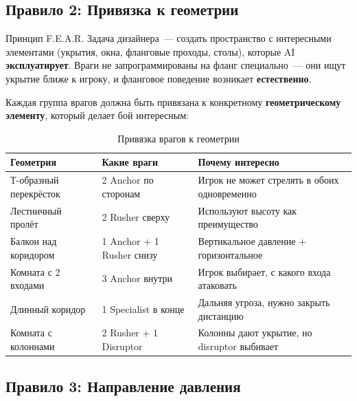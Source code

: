 \documentclass[a4paper,11pt]{report}
\begin{document}
\subsection{Правило 2: Привязка к геометрии}

\begin{principle}{Принцип F.E.A.R.}
Задача дизайнера~--- создать пространство с интересными элементами
(укрытия, окна, фланговые проходы, столы), которые AI \textbf{эксплуатирует}.
Враги не запрограммированы на фланг специально~--- они ищут укрытие
ближе к игроку, и фланговое поведение возникает \textbf{естественно}.
\end{principle}

Каждая группа врагов должна быть привязана к конкретному
\textbf{геометрическому элементу}, который делает бой интересным:

\begin{table}[H]
\centering
\caption{Привязка врагов к геометрии}
\begin{tabularx}{\textwidth}{@{}lXX@{}}
\toprule
\textbf{Геометрия} & \textbf{Какие враги} & \textbf{Почему интересно} \\
\midrule
Т-образный перекрёсток & 2 Anchor по сторонам & Игрок не может стрелять в обоих одновременно \\
Лестничный пролёт & 2 Rusher сверху & Используют высоту как преимущество \\
Балкон над коридором & 1 Anchor + 1 Rusher снизу & Вертикальное давление + горизонтальное \\
Комната с 2 входами & 3 Anchor внутри & Игрок выбирает, с какого входа атаковать \\
Длинный коридор & 1 Specialist в конце & Дальняя угроза, нужно закрыть дистанцию \\
Комната с колоннами & 2 Rusher + 1 Disruptor & Колонны дают укрытие, но disruptor выбивает \\
\bottomrule
\end{tabularx}
\end{table}

\subsection{Правило 3: Направление давления}
\end{document}
